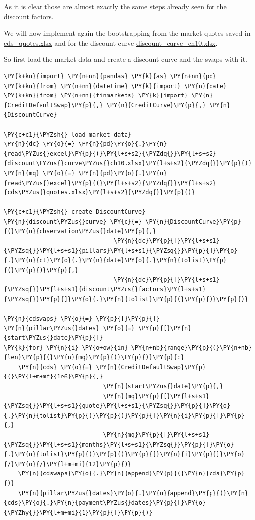 {As it is clear those are almost exactly the same steps already seen for the discount factors.

We will now implement again the bootstrapping from the market quotes saved in \href{https://drive.google.com/file/d/1BOtwCFYk0CUwYkMhnowWTj0HNOpBefd_/view?usp=sharing}{cds\_quotes.xlsx} and for the discount curve \href{https://drive.google.com/file/d/1mugHyet3H9tcSAvYvt8G4_kpfaEbVY7b/view?usp=sharing}{discount\_curve\_ch10.xlsx}.

So first load the market data and create a discount curve and the swaps with it.
\begin{tcolorbox}[breakable, size=fbox, boxrule=1pt, pad at break*=1mm,colback=cellbackground, colframe=cellborder]
\begin{Verbatim}[commandchars=\\\{\}]
\PY{k+kn}{import} \PY{n+nn}{pandas} \PY{k}{as} \PY{n+nn}{pd}
\PY{k+kn}{from} \PY{n+nn}{datetime} \PY{k}{import} \PY{n}{date}
\PY{k+kn}{from} \PY{n+nn}{finmarkets} \PY{k}{import} \PY{n}{CreditDefaultSwap}\PY{p}{,} \PY{n}{CreditCurve}\PY{p}{,} \PY{n}{DiscountCurve}
	
\PY{c+c1}{\PYZsh{} load market data}
\PY{n}{dc} \PY{o}{=} \PY{n}{pd}\PY{o}{.}\PY{n}{read\PYZus{}excel}\PY{p}{(}\PY{l+s+s2}{\PYZdq{}}\PY{l+s+s2}{discount\PYZus{}curve\PYZus{}ch10.xlsx}\PY{l+s+s2}{\PYZdq{}}\PY{p}{)}
\PY{n}{mq} \PY{o}{=} \PY{n}{pd}\PY{o}{.}\PY{n}{read\PYZus{}excel}\PY{p}{(}\PY{l+s+s2}{\PYZdq{}}\PY{l+s+s2}{cds\PYZus{}quotes.xlsx}\PY{l+s+s2}{\PYZdq{}}\PY{p}{)}
	
\PY{c+c1}{\PYZsh{} create DiscountCurve}
\PY{n}{discount\PYZus{}curve} \PY{o}{=} \PY{n}{DiscountCurve}\PY{p}{(}\PY{n}{observation\PYZus{}date}\PY{p}{,}
                               \PY{n}{dc}\PY{p}{[}\PY{l+s+s1}{\PYZsq{}}\PY{l+s+s1}{pillars}\PY{l+s+s1}{\PYZsq{}}\PY{p}{]}\PY{o}{.}\PY{n}{dt}\PY{o}{.}\PY{n}{date}\PY{o}{.}\PY{n}{tolist}\PY{p}{(}\PY{p}{)}\PY{p}{,}
                               \PY{n}{dc}\PY{p}{[}\PY{l+s+s1}{\PYZsq{}}\PY{l+s+s1}{discount\PYZus{}factors}\PY{l+s+s1}{\PYZsq{}}\PY{p}{]}\PY{o}{.}\PY{n}{tolist}\PY{p}{(}\PY{p}{)}\PY{p}{)}
	
\PY{n}{cdswaps} \PY{o}{=} \PY{p}{[}\PY{p}{]}
\PY{n}{pillar\PYZus{}dates} \PY{o}{=} \PY{p}{[}\PY{n}{start\PYZus{}date}\PY{p}{]}
\PY{k}{for} \PY{n}{i} \PY{o+ow}{in} \PY{n+nb}{range}\PY{p}{(}\PY{n+nb}{len}\PY{p}{(}\PY{n}{mq}\PY{p}{)}\PY{p}{)}\PY{p}{:}
    \PY{n}{cds} \PY{o}{=} \PY{n}{CreditDefaultSwap}\PY{p}{(}\PY{l+m+mf}{1e6}\PY{p}{,}
                            \PY{n}{start\PYZus{}date}\PY{p}{,}
                            \PY{n}{mq}\PY{p}{[}\PY{l+s+s1}{\PYZsq{}}\PY{l+s+s1}{quote}\PY{l+s+s1}{\PYZsq{}}\PY{p}{]}\PY{o}{.}\PY{n}{tolist}\PY{p}{(}\PY{p}{)}\PY{p}{[}\PY{n}{i}\PY{p}{]}\PY{p}{,}
                            \PY{n}{mq}\PY{p}{[}\PY{l+s+s1}{\PYZsq{}}\PY{l+s+s1}{months}\PY{l+s+s1}{\PYZsq{}}\PY{p}{]}\PY{o}{.}\PY{n}{tolist}\PY{p}{(}\PY{p}{)}\PY{p}{[}\PY{n}{i}\PY{p}{]}\PY{o}{/}\PY{o}{/}\PY{l+m+mi}{12}\PY{p}{)}
    \PY{n}{cdswaps}\PY{o}{.}\PY{n}{append}\PY{p}{(}\PY{n}{cds}\PY{p}{)}
    \PY{n}{pillar\PYZus{}dates}\PY{o}{.}\PY{n}{append}\PY{p}{(}\PY{n}{cds}\PY{o}{.}\PY{n}{payment\PYZus{}dates}\PY{p}{[}\PY{o}{\PYZhy{}}\PY{l+m+mi}{1}\PY{p}{]}\PY{p}{)}
\end{Verbatim}
\end{tcolorbox}

}
